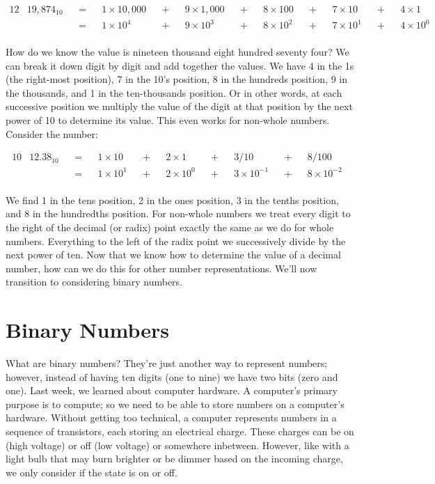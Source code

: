 \begin{alignat*}{12}
& 19,874_{10} &&=&& 1\times10,000 &&+&& 9\times1,000 &&+&& 8\times100  &&+&& 7\times10   &&+&& 4\times1    &\\
&             &&=&& 1\times10^4   &&+&& 9\times10^3  &&+&& 8\times10^2 &&+&& 7\times10^1 &&+&& 4\times10^0 &\\
\end{alignat*}

How do we know the value is nineteen thousand eight hundred seventy four? We can
break it down digit by digit and add together the values. We have 4 in the 1s (the
right-most position), 7 in the 10’s position, 8 in the hundreds position, 9 in the
thousands, and 1 in the ten-thousands position. Or in other words, at each
successive position we multiply the value of the digit at that position by the next
power of 10 to determine its value. This even works for non-whole numbers. Consider
the number:

\begin{alignat*}{10}
& 12.38_{10} &&=&& 1\times10   &&+&& 2\times1    &&+&& 3/10           &&+&& 8/100            &\\
&            &&=&& 1\times10^1 &&+&& 2\times10^0 &&+&& 3\times10^{-1} &&+&& 8 \times 10^{-2} &\\
\end{alignat*}

We find 1 in the tens position, 2 in the ones position, 3 in the tenths position,
and 8 in the hundredths position. For non-whole numbers we treat every digit to the
right of the decimal (or radix) point exactly the same as we do for whole numbers.
Everything to the left of the radix point we successively divide by the next power
of ten. Now that we know how to determine the value of a decimal number, how can we
do this for other number representations. We’ll now transition to considering binary
numbers.

\section{Binary Numbers}
What are binary numbers? They’re just another way to represent numbers; however,
instead of having ten digits (one to nine) we have two bits (zero and one). Last
week, we learned about computer hardware. A computer’s primary purpose is to
compute; so we need to be able to store numbers on a computer’s hardware. Without
getting too technical, a computer represents numbers in a sequence of transistors,
each storing an electrical charge. These charges can be on (high voltage) or off
(low voltage) or somewhere inbetween. However, like with a light bulb that may burn
brighter or be dimmer based on the incoming charge, we only consider if the state
is on or off.


